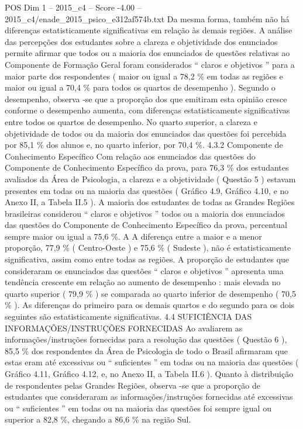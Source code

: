 \begin{textsample}{POS Dim 1 – 2015\_c4 – Score -4.00 – 2015\_c4/enade\_2015\_psico\_e312af574b.txt}
Da mesma forma, também não há diferenças estatisticamente significativas em relação às demais regiões.
A análise das percepções dos estudantes sobre a clareza e objetividade dos enunciados permite afirmar que todos ou a maioria dos enunciados de questões relativas ao Componente de Formação Geral foram considerados “ claros e objetivos ” para a maior parte dos respondentes ( maior ou igual a 78,2 \% em todas as regiões e maior ou igual a 70,4 \% para todos os quartos de desempenho ).
Segundo o desempenho, observa -se que a proporção dos que emitiram esta opinião cresce conforme o desempenho aumenta, com diferenças estatisticamente significativas entre todos os quartos de desempenho.
No quarto superior, a clareza e objetividade de todos ou da maioria dos enunciados das questões foi percebida por 85,1 \% dos alunos e, no quarto inferior, por 70,4 \%. 4.3.2 Componente de Conhecimento Específico Com relação aos enunciados das questões do Componente de Conhecimento Específico da prova, para 76,3 \% dos estudantes avaliados da Área de Psicologia, a clareza e a objetividade ( Questão 5 ) estavam presentes em todas ou na maioria das questões ( Gráfico 4.9, Gráfico 4.10, e no Anexo II, a Tabela II.5 ).
A maioria dos estudantes de todas as Grandes Regiões brasileiras considerou “ claros e objetivos ” todos ou a maioria dos enunciados das questões do Componente de Conhecimento Específico da prova, percentual sempre maior ou igual a 75,6 \%.
A A diferença entre a maior e a menor proporção, 77,9 \% ( Centro-Oeste ) e 75,6 \% ( Sudeste ), não é estatisticamente significativa, assim como entre todas as regiões.
A proporção de estudantes que consideraram os enunciados das questões “ claros e objetivos ” apresenta uma tendência crescente em relação ao aumento de desempenho : mais elevada no quarto superior ( 79,9 \% ) se comparada ao quarto inferior de desempenho ( 70,5 \% ).
As diferenças do primeiro para os demais quartos e do segundo para os dois seguintes são estatisticamente significativas. 4.4 SUFICIÊNCIA DAS INFORMAÇÕES/INSTRUÇÕES FORNECIDAS Ao avaliarem as informações/instruções fornecidas para a resolução das questões ( Questão 6 ), 85,5 \% dos respondentes da Área de Psicologia de todo o Brasil afirmaram que estas eram até excessivas ou “ suficientes ” em todas ou na maioria das questões ( Gráfico 4.11, Gráfico 4.12, e, no Anexo II, a Tabela II.6 ).
Quanto à distribuição de respondentes pelas Grandes Regiões, observa -se que a proporção de estudantes que consideraram as informações/instruções fornecidas até excessivas ou “ suficientes ” em todas ou na maioria das questões foi sempre igual ou superior a 82,8 \%, chegando a 86,6 \% na região Sul.

\end{textsample}
